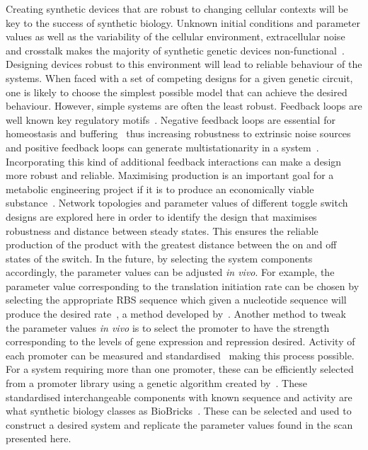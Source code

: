 Creating synthetic devices that are robust to changing cellular contexts will be key to the success of synthetic biology. Unknown initial conditions and parameter values as well as the variability of the cellular environment, extracellular noise and crosstalk makes the majority of synthetic genetic devices non-functional~\autocite{Chen:2009ea}. Designing devices robust to this environment will lead to reliable behaviour of the systems.
When faced with a set of competing designs for a given genetic circuit, one is likely to choose the simplest possible model that can achieve the desired behaviour. However, simple systems are often the least robust. Feedback loops are well known key regulatory motifs~\autocite{Brandman:2005ci}. Negative feedback loops are essential for homeostasis and buffering~\autocite{Thomas:1995id} thus increasing robustness to extrinsic noise sources and positive feedback loops can generate multistationarity in a system~\autocite{Thomas:1995id}. Incorporating this kind of additional feedback interactions can make a design more robust and reliable. 
Maximising production is an important goal for a metabolic engineering project if it is to produce an economically viable substance~\autocite{Holtz:2010bm}. Network topologies and parameter values of different toggle switch designs are explored here in order to identify the design that maximises robustness and distance between steady states. This ensures the reliable production of the product with the greatest distance between the on and off states of the switch. 
 In the future, by selecting the system components accordingly, the parameter values can be adjusted \textit{in vivo}. For example, the parameter value corresponding to the translation initiation rate can be chosen by selecting the appropriate RBS sequence which given a nucleotide sequence will produce the desired rate~\autocite{Holtz:2010bm}, a method developed by~\textcite{Salis:2009gk}. Another method to tweak the parameter values \textit{in vivo} is to select the promoter to have the strength corresponding to the levels of gene expression and repression desired. Activity of each promoter can be measured and standardised~\autocite{Kelly:2009bj} making this process possible. For a system requiring more than one promoter, these can be efficiently selected from a promoter library using a genetic algorithm created by~\textcite{Wu:2011bq}. These standardised interchangeable components with known sequence and activity are what synthetic biology classes as BioBricks~\autocite{Kelly:2009bj,Canton:2008fv}. These can be selected and used to construct a desired system and replicate the parameter values found in the scan presented here.

